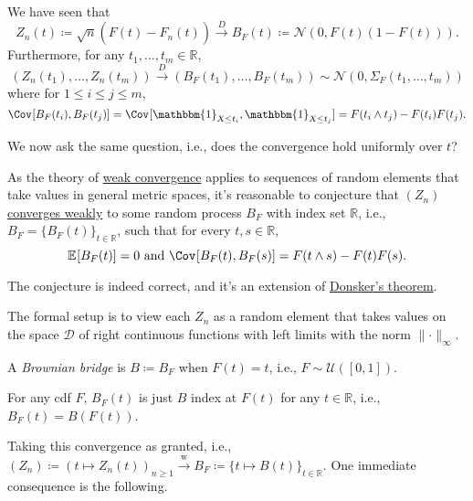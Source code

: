 \begin{prev}
	We have seen that
	\[
		Z_n(t) \coloneqq \sqrt{n} (F(t) - \hat{F} _n(t))
		\overset{D}{\to} B_F(t) \coloneqq \mathcal{N} (0, F(t) (1 - F(t))).
	\]
	Furthermore, for any \(t_1, \dots , t_m \in \mathbb{R} \),
	\[
		(Z_n(t_1), \dots , Z_n(t_m)) \overset{D}{\to} (B_F(t_1), \dots , B_F(t_m)) \sim \mathcal{N} (0, \Sigma _F(t_1, \dots , t_m))
	\]
	where for \(1 \leq i \leq j \leq m\),
	\[
		\Cov_{}[B_F(t_i), B_F(t_j)]
		= \Cov_{}[\mathbbm{1}_{X \leq t_i} , \mathbbm{1}_{X \leq t_j} ]
		= F(t_i \land t_j) - F(t_i) F(t_j).
	\]
\end{prev}

We now ask the same question, i.e., does the convergence hold uniformly over \(t\)?

\begin{intuition}
	As the theory of \hyperref[def:converge-weakly]{weak convergence} applies to sequences of random elements that take values in general metric spaces, it's reasonable to conjecture that \((Z_n)\) \hyperref[def:converge-weakly]{converges weakly} to some random process \(B_F\) with index set \(\mathbb{R} \), i.e., \(B_F = \{ B_F(t) \} _{t\in \mathbb{R} }\), such that for every \(t, s\in \mathbb{R} \),
	\[
		\mathbb{E}_{}[B_F(t)] = 0 \text{ and } \Cov_{}[B_F(t), B_F(s)] = F(t \land s) - F(t) F(s).
	\]
\end{intuition}

The conjecture is indeed correct, and it's an extension of \href{https://en.wikipedia.org/wiki/Donsker%27s_theorem}{Donsker's theorem}.

\begin{note}
	The formal setup is to view each \(Z_n\) as a random element that takes values on the space \(\mathcal{D} \) of right continuous functions with left limits with the norm \(\lVert \cdot \rVert _\infty \).
\end{note}

\begin{eg}
	A \emph{Brownian bridge} is \(B \coloneqq B_F\) when \(F(t) = t\), i.e., \(F \sim \mathcal{U} ([0, 1])\).
\end{eg}

\begin{note}
	For any cdf \(F\), \(B_F(t)\) is just \(B\) index at \(F(t)\) for any \(t \in \mathbb{R} \), i.e., \(B_F(t) = B(F(t))\).
\end{note}

Taking this convergence as granted, i.e., \((Z_n) \coloneqq (t \mapsto Z_n(t))_{n \geq 1} \overset{\text{w} }{\to} B_F \coloneqq \{ t \mapsto B(t) \}_{t\in \mathbb{R} } \). One immediate consequence is the following.

